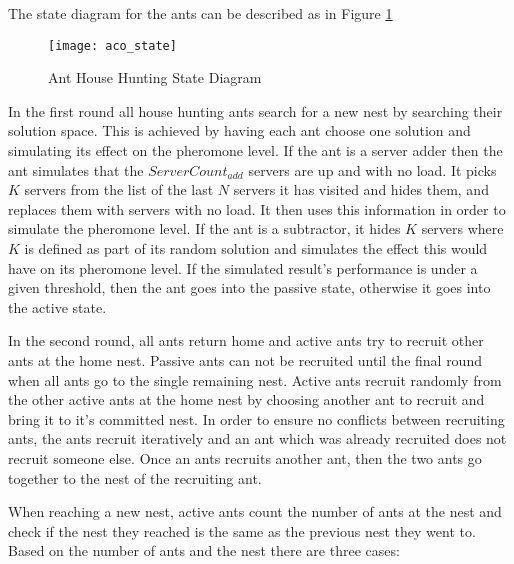 The state diagram for the ants can be described as in Figure \ref{fig:anthousehuntingstate}

\begin{figure}
	\centering
	\texttt{[image: aco\_state]}
	\caption{Ant House Hunting State Diagram}
	\label{fig:anthousehuntingstate}
\end{figure}

In the first round all house hunting ants search for a new nest by searching their solution space. This is achieved by having each ant choose one solution and simulating its effect on the pheromone level. If the ant is a server adder then the ant simulates that the $ServerCount_{add}$ servers are up and with no load. It picks $K$ servers from the list of the last $N$ servers it has visited and hides them, and replaces them with servers with no load. It then uses this information in order to simulate the pheromone level. If the ant is a subtractor, it hides $K$ servers where $K$ is defined as part of its random solution and simulates the effect this would have on its pheromone level. If the simulated result's performance is under a given threshold, then the ant goes into the passive state, otherwise it goes into the active state.

In the second round, all ants return home and active ants try to recruit other ants at the home nest. Passive ants can not be recruited until the final round when all ants go to the single remaining nest. Active ants recruit randomly from the other active ants at the home nest by choosing another ant to recruit and bring it to it's committed nest. In order to ensure no conflicts between recruiting ants, the ants recruit iteratively and an ant which was already recruited does not recruit someone else. Once an ants recruits another ant, then the two ants go together to the nest of the recruiting ant.

When reaching a new nest, active ants count the number of ants at the nest and check if the nest they reached is the same as the previous nest they went to. Based on the number of ants and the nest there are three cases:

